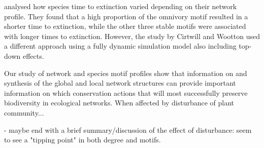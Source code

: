 \documentclass[12pt]{article}
\begin{document}
\begin{spacing}{2.0}
 \cite{Cirtwill2021_inprep} analysed how species time to extinction varied depending on their network profile. They found that a high proportion of the omnivory motif resulted in a shorter time to extinction, while the other three stable motifs were associated with longer times to extinction. However, the study by Cirtwill and Wootton used a different approach using a fully dynamic simulation model also including top-down effects. 
 
Our study of network and species motif profiles show that information on and synthesis of the global and local network structures can provide important information on which conservation actions that will most successfully preserve biodiversity in ecological networks. When affected by disturbance of plant community... 

- maybe end with a brief summary/discussion of the effect of disturbance: seem to see a "tipping point" in both degree and motifs.


    
    
    




\end{spacing}
\end{document}
